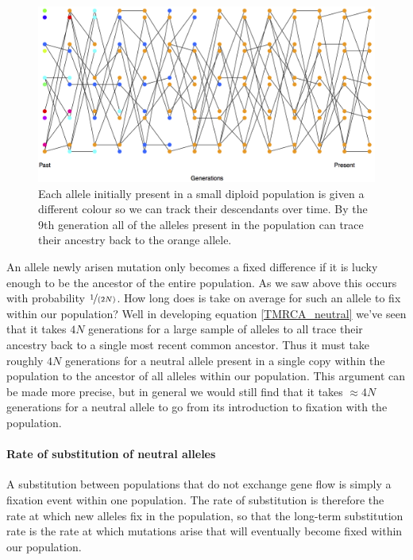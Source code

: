 \begin{figure}
\begin{center}
  \includegraphics[width = \textwidth]{figures/Substitution_sim.png}
\end{center}
\caption{Each allele initially present in a small diploid population is
  given a different colour so we can track their descendants over
  time. By the 9th generation all of the alleles present in the
  population can trace their ancestry back to the orange allele.} \label{fig:subs_simulation}
\end{figure}


An allele newly arisen mutation only becomes a fixed difference if it is lucky
enough to be the ancestor of the entire population. As we saw above this occurs
with probability $\nicefrac{1}{(2N)}$. How long does is take on average for
such an allele to fix within our population? Well in developing
equation \eqref{TMRCA_neutral} we've seen that it takes $4N$
generations for a large sample of alleles to all trace their ancestry back to a
single most recent common ancestor. Thus it must take roughly $4N$ generations
for a neutral allele present in a single copy within the population to the
ancestor of all alleles within our population. This argument can be made more
precise, but in general we would still find that it takes $\approx 4N$
generations for a neutral allele to go from its introduction to fixation with
the population.   \\


\paragraph{Rate of substitution of neutral alleles}

A substitution between populations that do not exchange gene flow is simply a
fixation event within one population. The rate of substitution is therefore the
rate at which new alleles fix in the population, so that the long-term
substitution rate is the rate at which mutations arise that will eventually
become fixed within our population.\\

